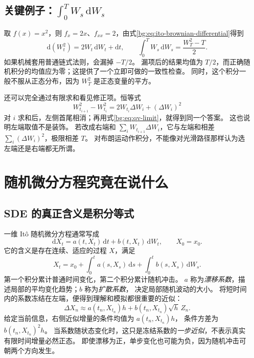 \subsection{关键例子：$\int_0^T W_s\,\mathrm dW_s$}
\label{bg:sub:w-dw}

取 $f(x)=x^2$，则 $f_x=2x$、$f_{xx}=2$，由式\eqref{bg:eq:ito-brownian-differential}得到
\begin{equation}
  \mathrm d(W_t^2)=2W_t\,\mathrm dW_t+\mathrm dt,
  \qquad
  \int_0^T W_s\,\mathrm dW_s=\frac{W_T^2-T}{2}.
  \label{bg:eq:w-dw-example}
\end{equation}
如果机械套用普通链式法则，会漏掉 $-T/2$。
漏项后的结果均值为 $T/2$，而正确随机积分的均值应为零；这提供了一个立即可做的一致性检查。
同时，这个积分一般不服从正态分布，因为 $W_T^2$ 是正态变量的平方。

还可以完全通过有限求和看见修正项。恒等式
\begin{equation}
  W_{t_{i+1}}^2-W_{t_i}^2
  =2W_{t_i}\Delta W_i+(\Delta W_i)^2
  \label{bg:eq:square-telescoping}
\end{equation}
对 $i$ 求和后，左侧首尾相消；再用式\eqref{bg:eq:qv-limit}，就得到同一个答案。
这也说明左端取值不是装饰。
若改成右端和 $\sum_iW_{t_{i+1}}\Delta W_i$，它与左端和相差
$\sum_i(\Delta W_i)^2$，极限相差 $T$。
对布朗运动作积分，不能像对光滑路径那样认为选左端还是右端都无所谓。

\section{随机微分方程究竟在说什么}
\label{bg:sec:sde}

\subsection{SDE 的真正含义是积分等式}
\label{bg:sub:sde-meaning}

一维 It\^o 随机微分方程通常写成
\begin{equation}
  \mathrm dX_t=a(t,X_t)\,\mathrm dt+b(t,X_t)\,\mathrm dW_t,
  \qquad X_0=x_0.
  \label{bg:eq:sde-differential}
\end{equation}
它的含义是存在连续、适应的过程 $X$，满足
\begin{equation}
  X_t=x_0+\int_0^t a(s,X_s)\,\mathrm ds
             +\int_0^t b(s,X_s)\,\mathrm dW_s.
  \label{bg:eq:sde-integral}
\end{equation}
第一个积分累计普通时间变化，第二个积分累计随机冲击。
$a$ 称为\emph{漂移系数}，描述局部的平均变化趋势；$b$ 称为\emph{扩散系数}，
决定局部随机波动的大小。
将短时间内的系数冻结在左端，便得到理解和模拟都很重要的近似：
\begin{equation}
  \Delta X_n\approx a(t_n,X_{t_n})h+b(t_n,X_{t_n})\sqrt h\,Z_n.
  \label{bg:eq:sde-local-step}
\end{equation}
给定当前信息，右侧近似增量的条件均值为 $a(t_n,X_{t_n})h$，
条件方差为 $b(t_n,X_{t_n})^2h$。
当系数随状态变化时，这只是冻结系数的\emph{一步近似}，不表示真实有限时间增量必然正态。
即使漂移为正，单步变化也可能为负，因为随机冲击可朝两个方向发生。

